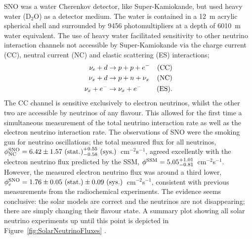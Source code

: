 SNO was a water Cherenkov detector, like Super-Kamiokande, but used heavy water (D$_2$O) as a detector medium.  The water is contained in a 12~m acrylic spherical shell and surrounded by 9456 photomultipliers at a depth of 6010~m water equivalent.  The use of heavy water facilitated sensitivity to other neutrino interaction channels not accessible by Super-Kamiokande via the charge current (CC), neutral current (NC) and elastic scattering (ES) interactions;
\begin{align}
  \nu_e + d &\rightarrow p + p + e^- &\textnormal{(CC)} \\
  \nu_x + d &\rightarrow p + n + \nu_x &\textnormal{(NC)} \\
  \nu_x + e^- &\rightarrow \nu_x + e^- &\textnormal{(ES)}.
\end{align}
The CC channel is sensitive exclusively to electron neutrinos, whilst the other two are accessible by neutrinos of any flavour.  This allowed for the first time a simultaneous measurement of the total neutrino interaction rate as well as the electron neutrino interaction rate.  The observations of SNO were the smoking gun for neutrino oscillations; the total measured flux for all neutrinos, $\phi_{\textnormal{NC}}^{\textnormal{SNO}} = 6.42\pm1.57\textnormal{~(stat.)}^{+0.55}_{-0.58}\textnormal{~(sys.)}$~cm$^{-2}$s$^{-1}$, agreed excellently with the electron neutrino flux predicted by the SSM, $\phi^{\textnormal{SSM}} = 5.05^{+1.01}_{-0.81}$~cm$^{-2}$s$^{-1}$.  However, the measured electron neutrino flux was around a third lower, $\phi_e^{\textnormal{SNO}} = 1.76\pm0.05\textnormal{~(stat.)}\pm0.09\textnormal{~(sys.)}$~cm$^{-2}$s$^{-1}$, consistent with previous measurements from the radiochemical experiments.  The evidence seems conclusive: the solar models are correct and the neutrinos are not disappearing; there are simply changing their flavour state.  A summary plot showing all solar neutrino experiments up until this point is depicted in Figure~\ref{fig:SolarNeutrinoFluxes} \cite{Bahcall2005Fluxes}.

